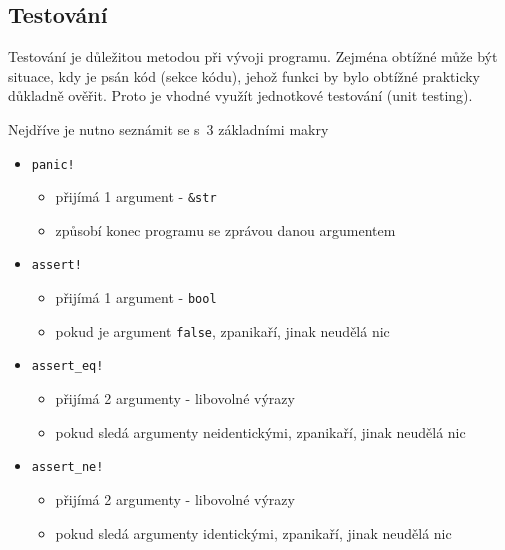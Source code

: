 \documentclass[a4paper, 12pt]{article} %
\newcommand{\rust}[1]{\texttt{#1}}
\begin{document}
    \subsection{Testování}
        Testování je důležitou metodou při vývoji programu. Zejména obtížné může být situace, kdy je psán kód (sekce kódu), jehož funkci by bylo obtížné prakticky důkladně ověřit. Proto je vhodné využít jednotkové testování (unit testing).
        
        Nejdříve je nutno seznámit se s~3 základními makry
        \begin{itemize}
            \item \rust{panic!}
                \begin{itemize}
                    \item přijímá 1 argument - \rust{&str}
                    \item způsobí konec programu se zprávou danou argumentem
                \end{itemize} 
            \item \rust{assert!}
                \begin{itemize}
                    \item přijímá 1 argument - \rust{bool}
                    \item pokud je argument \rust{false}, zpanikaří, jinak neudělá nic
                \end{itemize}
            \item \rust{assert_eq!}
                \begin{itemize}
                    \item přijímá 2 argumenty - libovolné výrazy
                    \item pokud sledá argumenty neidentickými, zpanikaří, jinak neudělá nic
                \end{itemize}
            \item \rust{assert_ne!}
                \begin{itemize}
                    \item přijímá 2 argumenty - libovolné výrazy
                    \item pokud sledá argumenty identickými, zpanikaří, jinak neudělá nic
                \end{itemize}
        \end{itemize}
\end{document}
